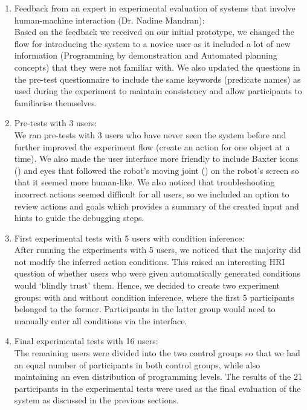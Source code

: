 \begin{enumerate}
	\item {Feedback from an expert in experimental evaluation of systems that involve human-machine interaction (Dr. Nadine Mandran):\\
		Based on the feedback we received on our initial prototype, we changed the flow for introducing the system to a novice user as it included a lot of new information (\eg Programming by demonstration and Automated planning concepts) that they were not familiar with.
		We also updated the questions in the pre-test questionnaire to include the same keywords (\ie predicate names) as used during the experiment to maintain consistency and allow participants to familiarise themselves.
	}
	\item {Pre-tests with 3 users:\\
		We ran pre-tests with 3 users who have never seen the system before and further improved the experiment flow (\eg create an action for one object at a time).
		We also made the user interface more friendly to include Baxter icons () and eyes that followed the robot's moving joint (\cite{baxtereyes}) on the robot's screen so that it seemed more human-like.
		We also noticed that troubleshooting incorrect actions seemed difficult for all users, so we included an option to review actions and goals which provides a summary of the created input and hints to guide the debugging steps.}
	\item {First experimental tests with 5 users with condition inference:\\
		After running the experiments with 5 users, we noticed that the majority did not modify the inferred action conditions.
		This raised an interesting HRI question of whether users who were given automatically generated conditions would `blindly trust' them.
		Hence, we decided to create two experiment groups: with and without condition inference, where the first 5 participants belonged to the former.
		Participants in the latter group would need to manually enter all conditions via the interface. }
	\item {Final experimental tests with 16 users: \\
		The remaining users were divided into the two control groups so that we had an equal number of participants in both control groups, while also maintaining an even distribution of programming levels.
		The results of the 21 participants in the experimental tests were used as the final evaluation of the system as discussed in the previous sections.
	}
\end{enumerate}

